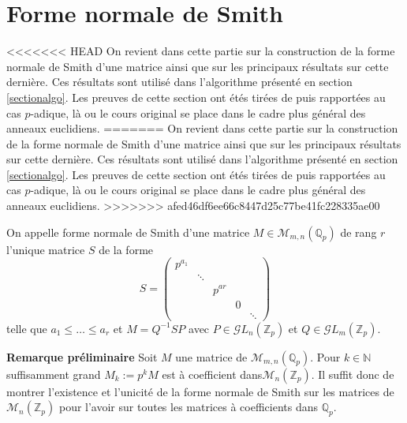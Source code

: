 \section{Forme normale de Smith}
\label{smith} 
<<<<<<< HEAD
On revient dans cette partie sur la construction de la forme normale de Smith d'une matrice ainsi que sur les principaux résultats sur cette dernière. Ces résultats sont utilisé dans l'algorithme présenté en section \ref{sectionalgo}.  Les preuves de cette section ont étés tirées de  puis rapportées au cas $p$-adique, là ou le cours original se place dans le cadre plus général des anneaux euclidiens.
=======
On revient dans cette partie sur la construction de la forme normale de Smith d'une matrice ainsi que sur les principaux résultats sur cette dernière. Ces résultats sont utilisé dans l'algorithme présenté en section \ref{sectionalgo}.  Les preuves de cette section ont étés tirées de \cite{howard_rings_nodate}  puis rapportées au cas $p$-adique, là ou le cours original se place dans le cadre plus général des anneaux euclidiens.
>>>>>>> afed46df6ee66c8447d25c77be41fc228335ae00



\begin{rappel}
	On appelle forme normale de Smith d'une matrice $M \in \mathcal{M}_{m,n}\left(\mathbb{Q}_{p} \right) $ de rang $r$ l'unique matrice $S$ de la forme $$S =  
	\begin{pmatrix} p^{a_1} & \\
		 & \ddots \\
		 & & p^{ar}\\
		 & & & 0\\
		 & & & & \ddots \end{pmatrix} $$
		 telle que $a_1\le  \ldots\le a_r$ et $M =  Q^{-1} S P$ avec $P \in \mathcal{G}L_n\left( \mathbb{Z}_p \right) $ et $Q \in \mathcal{G}L_m\left( \mathbb{Z}_p \right) $.
\end{rappel}
\textbf{Remarque préliminaire} 
Soit $M$ une matrice de $\mathcal{M}_{m,n}\left(\mathbb{Q}_{p} \right) $. Pour $k \in \mathbb{N}$ suffisamment grand $M_k := p^k M$ est à coefficient dans$\mathcal{M}_{n}\left(\mathbb{Z}_p\right)$. Il suffit donc de montrer l'existence et l'unicité de la forme normale de Smith sur les matrices de $\mathcal{M}_{n}\left(\mathbb{Z}_p\right) $ pour l'avoir sur toutes les matrices à coefficients dans $\mathbb{Q}_{p}$.

